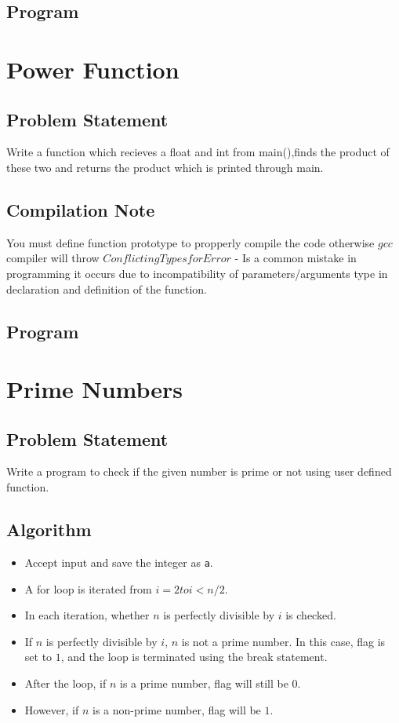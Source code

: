 \documentclass[11pt]{report}
\begin{document}
\section{Program}


\chapter{Power Function}
\section{Problem Statement}
Write a function which recieves a float and int from main(),finds the product of these two and returns the product which is printed through main.
\section{Compilation Note}
You must define function prototype to propperly compile the code otherwise $gcc$ compiler will throw $Conflicting  Types  for  Error$ - Is a common mistake in programming it occurs due to incompatibility of parameters/arguments type in declaration and definition of the function.
\section{Program}
		

\chapter{Prime Numbers}
\section{Problem Statement}
Write a program to check if the given number is prime or not using user defined function. 
\section{Algorithm}
\begin{itemize}
  \item Accept input and save the integer as \texttt{a}.
  \item A for loop is iterated from $i = 2 to i < n/2$.
  \item In each iteration, whether $n$ is perfectly divisible by $i$ is checked.
  \item If $n$ is perfectly divisible by $i$, $n$ is not a prime number. In this case, flag is set to $1$, and the loop is terminated using the break statement.
  \item After the loop, if $n$ is a prime number, flag will still be $0$.
  \item However, if $n$ is a non-prime number, flag will be $1$.
\end{itemize}
\leavevmode
\end{document}
